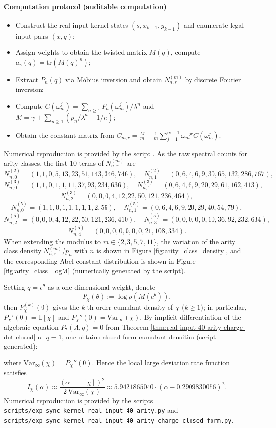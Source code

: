 \paragraph{Computation protocol (auditable computation)}
\begin{itemize}
  \item Construct the real input kernel states $(s,x_{k-1},y_{k-1})$ and enumerate legal input pairs $(x,y)$;
  \item Assign weights to obtain the twisted matrix $M(q)$, compute $a_n(q)=\mathrm{tr}(M(q)^n)$;
  \item Extract $P_n(q)$ via M\"obius inversion and obtain $N_{n,r}^{(m)}$ by discrete Fourier inversion;
  \item Compute $C(\omega_m^j)=\sum_{n\ge 1}P_n(\omega_m^j)/\lambda^n$ and
  $M=\gamma+\sum_{n\ge 1}(p_n/\lambda^n-1/n)$;
  \item Obtain the constant matrix from $C_{m,r}=\frac{M}{m}+\frac{1}{m}\sum_{j=1}^{m-1}\omega_m^{-jr}C(\omega_m^j)$.
\end{itemize}
Numerical reproduction is provided by the script .
As the raw spectral counts for arity classes, the first $10$ terms of $N_{n,r}^{(m)}$ are
\[
N_{n,0}^{(2)}=(1,1,0,5,13,23,51,143,346,746),\quad
N_{n,1}^{(2)}=(0,6,4,6,9,30,65,132,286,767),
\]
\[
N_{n,0}^{(3)}=(1,1,0,1,1,11,37,93,234,636),\quad
N_{n,1}^{(3)}=(0,6,4,6,9,20,29,61,162,413),
\]
\[
N_{n,2}^{(3)}=(0,0,0,4,12,22,50,121,236,464),
\]
\[
N_{n,0}^{(5)}=(1,1,0,1,1,1,1,1,2,56),\quad
N_{n,1}^{(5)}=(0,6,4,6,9,20,29,40,54,79),
\]
\[
N_{n,2}^{(5)}=(0,0,0,4,12,22,50,121,236,410),\quad
N_{n,3}^{(5)}=(0,0,0,0,0,10,36,92,232,634),
\]
\[
N_{n,4}^{(5)}=(0,0,0,0,0,0,0,21,108,334).
\]
When extending the modulus to $m\in\{2,3,5,7,11\}$, the variation of the arity class density $N_{n,r}^{(m)}/p_n$ with $n$ is shown in Figure \ref{fig:arity_class_density},
and the corresponding Abel constant distribution is shown in Figure \ref{fig:arity_class_logM} (numerically generated by the script).


Setting $q=e^\theta$ as a one-dimensional weight, denote
\[
P_\chi(\theta):=\log\rho(M(e^\theta)),
\]
then $P_\chi^{(k)}(0)$ gives the $k$-th order cumulant density of $\chi$ ($k\ge 1$); in particular,
$P_\chi'(0)=\mathbb{E}[\chi]$ and $P_\chi''(0)=\mathrm{Var}_\infty(\chi)$.
By implicit differentiation of the algebraic equation $P_7(\Lambda,q)=0$ from Theorem \ref{thm:real-input-40-arity-charge-det-closed} at $q=1$, one obtains closed-form cumulant densities (script-generated):

where $\mathrm{Var}_\infty(\chi)=P_\chi''(0)$.
Hence the local large deviation rate function satisfies
\[
I_\chi(\alpha)\approx \frac{(\alpha-\mathbb{E}[\chi])^2}{2\,\mathrm{Var}_\infty(\chi)}
\approx 5.9421865040\cdot(\alpha-0.2909830056)^2.
\]
Numerical reproduction is provided by the scripts \texttt{scripts/exp\_sync\_kernel\_real\_input\_40\_arity.py} and
\texttt{scripts/exp\_sync\_kernel\_real\_input\_40\_arity\_charge\_closed\_form.py}.

